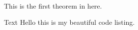 \documentclass{book}
\begin{document}
\begin{theorem}
  This is the first theorem in here.
\end{theorem}
\begin{code}[=,listing and text]{Text}
  Hello this is my beautiful code listing.
\end{code}
\end{document}
